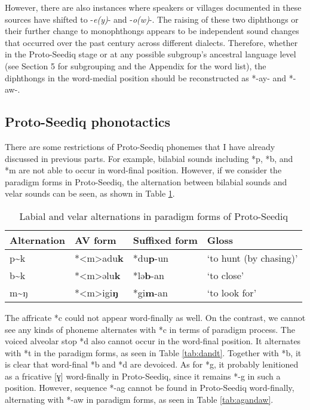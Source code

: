 \documentclass[12pt]{article}
\newcommand{\psedf}{Proto-Seediq\xspace}
\begin{document}
However, there are also instances where speakers or villages documented in these sources have shifted to -\textit{e(y)}- and -\textit{o(w)}-. The raising of these two diphthongs or their further change to monophthongs appears to be independent sound changes that occurred over the past century across different dialects. Therefore, whether in the \psedf stage or at any possible subgroup's ancestral language level (see Section 5 for subgrouping and the Appendix for the word list), the diphthongs in the word-medial position should be reconstructed as *-ay- and *-aw-.



\subsection{Proto-Seediq phonotactics}

There are some restrictions of \psedf phonemes that I have already discussed in previous parts. For example, bilabial sounds including *p, *b, and *m are not able to occur in word-final position. However, if we consider the paradigm forms in \psedf, the alternation between bilabial sounds and velar sounds can be seen, as shown in Table \ref{tab:lab-vel}.

\begin{table}[!htbp]
\centering
\caption{Labial and velar alternations in paradigm forms of \psedf}
\label{tab:lab-vel}
\begin{tabular}{llll}
\hline
Alternation & AV form & Suffixed form & Gloss                  \\ \hline
p\~{ }k     & *<m>adu\textbf{k}  & *du\textbf{p}-un       & `to hunt (by chasing)' \\
b\~{ }k     & *<m>əlu\textbf{k}  & *lə\textbf{b}-an       & `to close'             \\
m\~{ }ŋ     & *<m>igi\textbf{ŋ}  & *gi\textbf{m}-an       & `to look for'          \\ \hline
\end{tabular}
\end{table}

The affricate *c could not appear word-finally as well. On the contrast, we cannot see any kinds of phoneme alternates with *c in terms of paradigm process. The voiced alveolar stop *d also cannot occur in the word-final position. It alternates with *t in the paradigm forms, as seen in Table \ref{tab:dandt}. Together with *b, it is clear that word-final *b and *d are devoiced. As for *g, it probably lenitioned as a fricative [ɣ] word-finally in \psedf, since it remains *-g in such a position. However, sequence *-ag cannot be found in Proto-Seediq word-finally, alternating with *-aw in paradigm forms, as seen in Table \ref{tab:agandaw}.  
\end{document}
